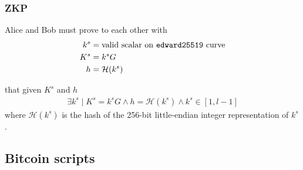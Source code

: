 \documentclass{llncs}
\begin{document}
\subsubsection{ZKP}
Alice and Bob must prove to each other with
\begin{equation}
\begin{split}
    k^s &= \text{valid scalar on \texttt{edward25519} curve} \\
    K^s &= k^sG \\
    h &= \mathcal{H}(k^s) \\
\end{split}
\end{equation}

that given $K^s$ and $h$
\begin{equation}
\begin{split}
    \exists k^s \mid K^s = k^sG \land h = \mathcal{H}(k^s) \land k^s \in [1, l-1]
\end{split}
\end{equation}
where $\mathcal{H}(k^s)$ is the hash of the 256-bit little-endian integer representation of $k^s$.

%

\subsection{Bitcoin scripts}
\end{document}
